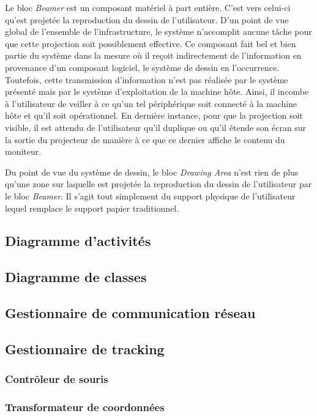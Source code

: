 \documentclass[11pt,a4paper,oldfontcommands]{memoir}
\begin{document}
Le bloc \textit{Beamer} est un composant matériel à part entière. C'est vers celui-ci qu'est projetée la reproduction du dessin de l'utilisateur. D'un point de vue global de l'ensemble de l'infrastructure, le système n'accomplit aucune tâche pour que cette projection soit possiblement effective. Ce composant fait bel et bien partie du système dans la mesure où il reçoit indirectement de l'information en provenance d'un composant logiciel, le système de dessin en l'occurrence. Toutefois, cette transmission d'information n'est pas réalisée par le système présenté mais par le système d'exploitation de la machine hôte. Ainsi, il incombe à l'utilisateur de veiller à ce qu'un tel périphérique soit connecté à la machine hôte et qu'il soit opérationnel. En dernière instance, pour que la projection soit visible, il est attendu de l'utilisateur qu'il duplique ou qu'il étende son écran sur la sortie du projecteur de manière à ce que ce dernier affiche le contenu du moniteur.

Du point de vue du système de dessin, le bloc \textit{Drawing Area} n'est rien de plus qu'une zone sur laquelle est projetée la reproduction du dessin de l'utilisateur par le bloc \textit{Beamer}. Il s'agit tout simplement du support physique de l'utilisateur lequel remplace le support papier traditionnel.

\subsection{Diagramme d'activités}

\subsection{Diagramme de classes}

\subsection{Gestionnaire de communication réseau}

\subsection{Gestionnaire de tracking}

\subsubsection{Contrôleur de souris}

\subsubsection{Transformateur de coordonnées}
\end{document}
